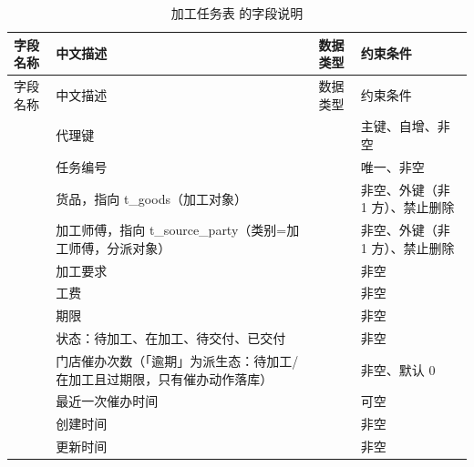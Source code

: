 \begin{longtable}{@{}L{3.5cm} L{4.1cm} L{2.9cm} L{4.0cm}@{}}
\caption{加工任务表  的字段说明}\label{tab:f-t-process-task}\\
\toprule
字段名称 & 中文描述 & 数据类型 & 约束条件 \\
\midrule
\endfirsthead
\toprule
字段名称 & 中文描述 & 数据类型 & 约束条件 \\
\midrule
\endhead
\bottomrule
\endlastfoot
{} & 代理键 &  & 主键、自增、非空 \\
 & 任务编号 &  & 唯一、非空 \\
 & 货品，指向 t\_goods（加工对象） &  & 非空、外键（非 1 方）、禁止删除 \\
 & 加工师傅，指向 t\_source\_party（类别=加工师傅，分派对象） &  & 非空、外键（非 1 方）、禁止删除 \\
 & 加工要求 &  & 非空 \\
 & 工费 &  & 非空 \\
 & 期限 &  & 非空 \\
 & 状态：待加工、在加工、待交付、已交付 &  & 非空 \\
 & 门店催办次数（「逾期」为派生态：待加工/在加工且过期限，只有催办动作落库） &  & 非空、默认 0 \\
 & 最近一次催办时间 &  & 可空 \\
 & 创建时间 &  & 非空 \\
 & 更新时间 &  & 非空 \\
\end{longtable}

